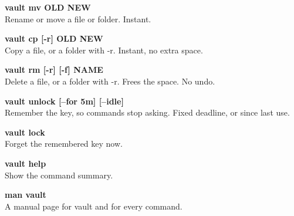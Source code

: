 \documentclass[10pt,oneside,openany]{book}
\begin{document}
\begin{tcbraster}[raster columns=2,raster equal height=rows,raster column skip=8pt,raster row skip=8pt,
  enhanced,colback=vmist,colframe=vline,boxrule=0.4pt,arc=4pt,left=9pt,right=9pt,top=7pt,bottom=7pt]
\begin{tcolorbox}{\ttfamily\color{vtealdeep}\bfseries vault mv OLD NEW}\\[2pt]\small Rename or move a file or folder. Instant.\end{tcolorbox}
\begin{tcolorbox}{\ttfamily\color{vtealdeep}\bfseries vault cp [-r] OLD NEW}\\[2pt]\small Copy a file, or a folder with -r. Instant, no extra space.\end{tcolorbox}
\begin{tcolorbox}{\ttfamily\color{vtealdeep}\bfseries vault rm [-r] [-f] NAME}\\[2pt]\small Delete a file, or a folder with -r. Frees the space. No undo.\end{tcolorbox}
\begin{tcolorbox}{\ttfamily\color{vtealdeep}\bfseries vault unlock [--for 5m] [--idle]}\\[2pt]\small Remember the key, so commands stop asking. Fixed deadline, or since last use.\end{tcolorbox}
\begin{tcolorbox}{\ttfamily\color{vtealdeep}\bfseries vault lock}\\[2pt]\small Forget the remembered key now.\end{tcolorbox}
\begin{tcolorbox}{\ttfamily\color{vtealdeep}\bfseries vault help}\\[2pt]\small Show the command summary.\end{tcolorbox}
\begin{tcolorbox}{\ttfamily\color{vtealdeep}\bfseries man vault}\\[2pt]\small A manual page for vault and for every command.\end{tcolorbox}
\end{tcbraster}
\end{document}
